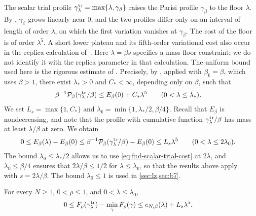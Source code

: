 The scalar trial profile $\gamma^{\rm tr}_\lambda=\max\{\lambda,\gamma_\beta\}$
raises the Parisi profile $\gamma_\beta$ to the floor $\lambda$. By
\cite[Lemma~7.2]{AL}, $\gamma_\beta$ grows linearly near $0$, and the two
profiles differ only on an interval of length of order $\lambda$, on
which the first variation vanishes at $\gamma_\beta$. The cost of the
floor is of order $\lambda^5$. A short lower plateau and its
fifth-order variational cost also occur in the replica calculation
of~\cite[Appendix~B, (B1)--(B3)]{ParisiRizzo2009}.
Here $\lambda=\beta s$ specifies a mass-floor constraint; we do not
identify it with the replica parameter in that calculation.
The uniform bound used here is the rigorous estimate of
\cite[Lemma~7.2]{AL}. Precisely, by
\cite[Lemma~7.2, (7.3)]{AL}, applied with $\beta_0=\beta$, which uses
$\beta>1$, there exist $\lambda_*>0$ and $C_*<\infty$, depending only on
$\beta$, such that
\[
 \beta^{-1}\mathcal P_\beta(\gamma^{\rm tr}_\lambda/\beta)
 \le E_\beta(0)+C_*\lambda^5
 \qquad(0<\lambda\le\lambda_*).
\]
We set $L_s=\max\{1,C_*\}$ and $\lambda_0=\min\{1,\lambda_*/2,\beta/4\}$.
Recall that $E_\beta$ is nondecreasing, and note that the profile with
cumulative function $\gamma^{\rm tr}_\lambda/\beta$ has mass at least
$\lambda/\beta$ at zero. We obtain
\begin{equation}\label{eq:fnd-scalar-trial-cost}
 0\le E_\beta(\lambda)-E_\beta(0)
 \le\beta^{-1}\mathcal P_\beta(\gamma_\lambda^{\rm tr}/\beta)
                      -E_\beta(0)
 \le L_s\lambda^5\qquad(0<\lambda\le2\lambda_0).
\end{equation}
The bound $\lambda_0\le\lambda_*/2$ allows us to use
\eqref{eq:fnd-scalar-trial-cost} at $2\lambda$, and $\lambda_0\le\beta/4$
ensures that $2\lambda/\beta\le1/2$ for $\lambda\le\lambda_0$, so that
the results above apply with $s=2\lambda/\beta$. The bound
$\lambda_0\le1$ is used in \cref{sec:lz,sec:b7}.

\begin{lemma}\label{lem:fnd-trial}
For every $N\ge1$, $0<\rho\le1$, and $0<\lambda\le\lambda_0$,
\begin{equation}\label{eq:fnd-trial}
 0\le F_\rho(\gamma_\lambda^{\rm tr})-\min_\gamma F_\rho(\gamma)
       \le e_{N,\beta}(\lambda)+L_s\lambda^5 .
\end{equation}
\end{lemma}

